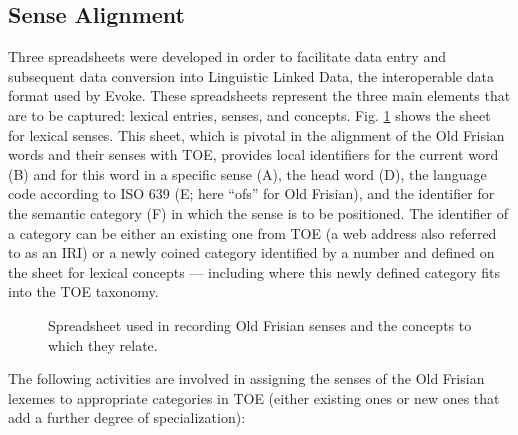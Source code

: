 \subsection{Sense Alignment}
Three spreadsheets were developed in order to facilitate data entry and subsequent data conversion into Linguistic Linked Data, the interoperable data format used by Evoke. These spreadsheets represent the three main elements that are to be captured: lexical entries, senses, and concepts. Fig. \ref{fig:Stolk2021b:Fig1} shows the sheet for lexical senses. This sheet, which is pivotal in the alignment of the Old Frisian words and their senses with TOE, provides local identifiers for the current word (B) and for this word in a specific sense (A), the head word (D), the language code according to ISO 639 (E; here “ofs” for Old Frisian), and the identifier for the semantic category (F) in which the sense is to be positioned. The identifier of a category can be either an existing one from TOE (a web address also referred to as an IRI) or a newly coined category identified by a number and defined on the sheet for lexical concepts — including where this newly defined category fits into the TOE taxonomy.

\begin{figure}[htbp]
	\caption[]{\label{fig:Stolk2021b:Fig1} Spreadsheet used in recording Old Frisian senses and the concepts to which they relate.}
\end{figure}

The following activities are involved in assigning the senses of the Old Frisian lexemes to appropriate categories in TOE (either existing ones or new ones that add a further degree of specialization):

